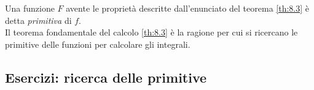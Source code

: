\begin{remark}
    Una funzione $F$ avente le proprietà descritte dall'enunciato del teorema \ref{th:8.3} è detta \emph{primitiva} di $f$.\\ 
    Il teorema fondamentale del calcolo \ref{th:8.3} è la ragione per cui si ricercano le primitive delle funzioni per calcolare gli integrali.
\end{remark}
\subsection{Esercizi: ricerca delle primitive}
